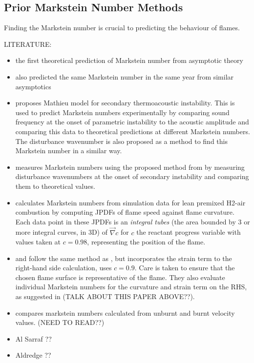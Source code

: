 \subsection{Prior Markstein Number Methods}

Finding the Markstein number is crucial to predicting the behaviour of flames.

LITERATURE:
\begin{itemize}
\item \cite{clavin1982EffectsMolecularDiffusion} the first theoretical prediction of Markstein number from asymptotic theory
\item \cite{matalon1982FlamesGasdynamicDiscontinuities} also predicted the same Markstein number in the same year from similar asymptotics
\item \cite{searby1991ParametricAcousticInstability} proposes Mathieu model for secondary thermoacoustic instability. This is used to predict Markstein numbers experimentally by comparing sound frequency at the onset of parametric instability to the acoustic amplitude and comparing this data to theoretical predictions at different Markstein numbers. The disturbance wavenumber is also proposed as a method to find this Markstein number in a similar way.
\item \cite{delfin2024DeterminationMethodMarkstein} measures Markstein numbers using the proposed method from \cite{searby1991ParametricAcousticInstability} by measuring disturbance wavenumbers at the onset of secondary instability and comparing them to theoretical values.
\item \cite{day2009TurbulenceEffectsCellular} calculates Markstein numbers from simulation data for lean premixed H2-air combustion by computing JPDFs of flame speed against flame curvature. Each data point in these JPDFs is an \emph{integral tubes} (the area bounded by 3 or more integral curves, in 3D) of $\vec{\nabla} c$ for $c$ the reactant progress variable with values taken at $c=0.98$, representing the position of the flame.
\item \cite{howarth2022EmpiricalCharacteristicScaling} and \cite{howarth2023ThermodiffusivelyunstableLeanPremixed} follow the same method as \cite{day2009TurbulenceEffectsCellular}, but incorporates the strain term to the right-hand side calculation, uses $c=0.9$. Care is taken to ensure that the chosen flame surface is representative of the flame. They also evaluate individual Markstein numbers for the curvature and strain term on the RHS, as suggested in \cite{clavin2011CurvedStretchedFlames} (TALK ABOUT THIS PAPER ABOVE??).
\item \cite{davis2002MarksteinNumbersCounterflow} compares markstein numbers calculated from unburnt and burnt velocity values. (NEED TO READ??)
\item Al Sarraf ??
\item Aldredge ??
\end{itemize}





